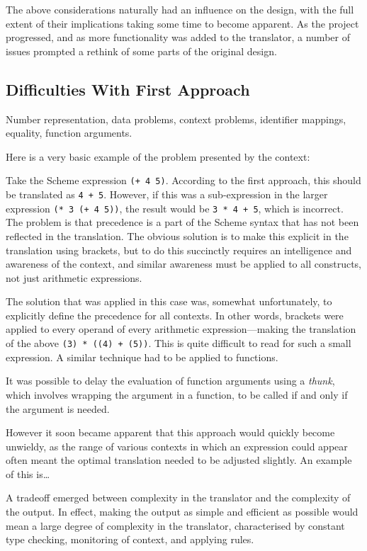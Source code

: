 The above considerations naturally had an influence on the design, with the full
extent of their implications taking some time to become apparent. As the
project progressed, and as more functionality was added to the translator, a
number of issues prompted a rethink of some parts of the original design.

\subsection{Difficulties With First Approach}

Number representation, data problems, context problems, identifier mappings,
equality, function arguments.

Here is a very basic example of the problem presented by the context:
\begin{framed}
Take the Scheme expression \texttt{(+ 4 5)}. According to the first approach,
this should be translated as \texttt{4 + 5}. However, if this was a
sub-expression in the larger expression \texttt{(*~3~(+~4~5))}, the result would
be \texttt{3~*~4~+~5}, which is incorrect. The problem is that precedence is
a part of the Scheme syntax that has not been reflected in the translation. The
obvious solution is to make this explicit in the translation using brackets, but
to do this succinctly requires an intelligence and awareness of the context, and
similar awareness must be applied to all constructs, not just arithmetic
expressions.
\end{framed}
The solution that was applied in this case was, somewhat unfortunately, to
explicitly define the precedence for all contexts. In other words, brackets were
applied to every operand of every arithmetic expression---making the translation
of the above \texttt{(3) * ((4) + (5))}. This is quite difficult to read for
such a small expression. A similar technique had to be applied to functions.

It was possible to delay the evaluation of function arguments using a
\emph{thunk}, which involves wrapping the argument in a function, to be called
if and only if the argument is needed.

However it soon became apparent that this approach would quickly become
unwieldy, as the range of various contexts in which an expression could appear
often meant the optimal translation needed to be adjusted slightly. An example
of this is\ldots

A tradeoff emerged between complexity in the translator and the complexity of
the output. In effect, making the output as simple and efficient as
possible would mean a large degree of complexity in the translator,
characterised by constant type checking, monitoring of context, and applying
rules.

